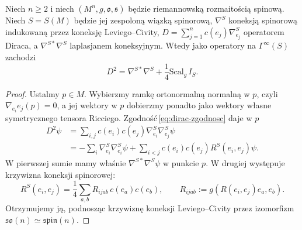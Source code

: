 \begin{twierdzenie}
\label{thm:lichnerowicz}
Niech $n\geq2$ i niech $(M^n,g,\mathfrak o,\mathfrak s)$
będzie riemannowską rozmaitością spinową. Niech
$S=S(M)$ będzie jej zespoloną wiązką spinorową,
$\nabla^S$ koneksją spinorową indukowaną przez koneksję
Leviego--Civity, $D=\sum_{j=1}^n c(e_j)\nabla^S_{e_j}$
operatorem Diraca, a $\nabla^{S*}\nabla^S$
laplasjanem koneksyjnym. Wtedy jako operatory na
$\Gamma^\infty(S)$ zachodzi
\begin{equation}\label{eq:lichnerowicz}
 D^2=\nabla^{S*}\nabla^S+\frac14\mathrm{Scal}_g\,I_S.
\end{equation}
\end{twierdzenie}
\begin{proof}
Ustalmy $p\in M$. Wybierzmy ramkę ortonormalną
normalną w $p$, czyli $\nabla_{e_i}e_j(p)=0$,
a jej wektory w $p$ dobierzmy ponadto jako wektory
własne symetrycznego tensora Ricciego.
Zgodność\,\eqref{eq:dirac-zgodnosc} daje w $p$
\begin{align*}
 D^2\psi
 &=\sum_{i,j}c(e_i)c(e_j)\nabla^S_{e_i}\nabla^S_{e_j}\psi\\
 &=-\sum_i\nabla^S_{e_i}\nabla^S_{e_i}\psi
   +\sum_{i<j}c(e_i)c(e_j)R^S(e_i,e_j)\psi.
\end{align*}
W pierwszej sumie mamy właśnie
$\nabla^{S*}\nabla^S\psi$ w punkcie $p$.
W drugiej występuje krzywizna koneksji spinorowej:
\begin{equation}\label{eq:dirac-krzywizna-spinowa}
 R^S(e_i,e_j)=\frac14\sum_{a,b}
 R_{ijab}\,c(e_a)c(e_b),\qquad
 R_{ijab}:=g(R(e_i,e_j)e_a,e_b).
\end{equation}
Otrzymujemy ją, podnosząc krzywiznę
koneksji Leviego--Civity przez izomorfizm
$\mathfrak{so}(n)\simeq\mathfrak{spin}(n)$.


\end{proof}
